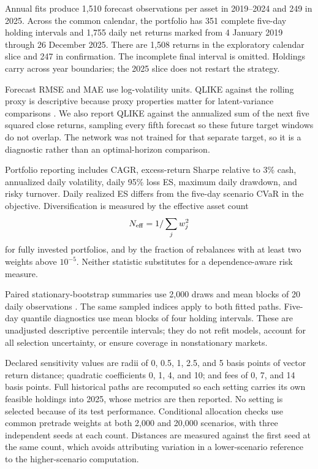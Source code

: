 Annual fits produce 1,510 forecast observations per asset in 2019--2024 and 249 in 2025. Across the common calendar, the portfolio has 351 complete five-day holding intervals and 1,755 daily net returns marked from 4 January 2019 through 26 December 2025. There are 1,508 returns in the exploratory calendar slice and 247 in confirmation. The incomplete final interval is omitted. Holdings carry across year boundaries; the 2025 slice does not restart the strategy.

Forecast RMSE and MAE use log-volatility units. QLIKE against the rolling proxy is descriptive because proxy properties matter for latent-variance comparisons \cite{patton}. We also report QLIKE against the annualized sum of the next five squared close returns, sampling every fifth forecast so these future target windows do not overlap. The network was not trained for that separate target, so it is a diagnostic rather than an optimal-horizon comparison.

Portfolio reporting includes CAGR, excess-return Sharpe relative to 3\% cash, annualized daily volatility, daily 95\% loss ES, maximum daily drawdown, and risky turnover. Daily realized ES differs from the five-day scenario CVaR in the objective. Diversification is measured by the effective asset count
\begin{equation}
N_{\rm eff}=1/\sum_j w_j^2
\end{equation}
for fully invested portfolios, and by the fraction of rebalances with at least two weights above $10^{-5}$. Neither statistic substitutes for a dependence-aware risk measure.

Paired stationary-bootstrap summaries use 2,000 draws and mean blocks of 20 daily observations \cite{bootstrap}. The same sampled indices apply to both fitted paths. Five-day quantile diagnostics use mean blocks of four holding intervals. These are unadjusted descriptive percentile intervals; they do not refit models, account for all selection uncertainty, or ensure coverage in nonstationary markets.

Declared sensitivity values are radii of 0, 0.5, 1, 2.5, and 5 basis points of vector return distance; quadratic coefficients 0, 1, 4, and 10; and fees of 0, 7, and 14 basis points. Full historical paths are recomputed so each setting carries its own feasible holdings into 2025, whose metrics are then reported. No setting is selected because of its test performance. Conditional allocation checks use common pretrade weights at both 2,000 and 20,000 scenarios, with three independent seeds at each count. Distances are measured against the first seed at the same count, which avoids attributing variation in a lower-scenario reference to the higher-scenario computation.
